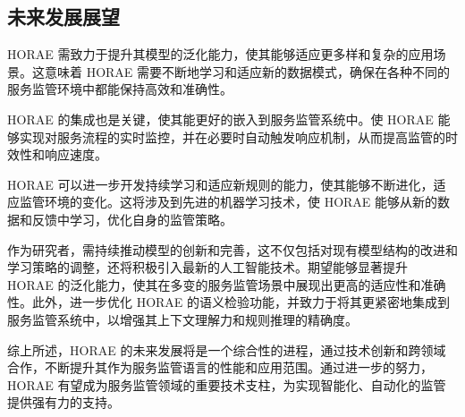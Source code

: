 \subsection{未来发展展望}

HORAE 需致力于提升其模型的泛化能力，使其能够适应更多样和复杂的应用场景。这意味着 HORAE 需要不断地学习和适应新的数据模式，确保在各种不同的服务监管环境中都能保持高效和准确性。

HORAE 的集成也是关键，使其能更好的嵌入到服务监管系统中。使 HORAE 能够实现对服务流程的实时监控，并在必要时自动触发响应机制，从而提高监管的时效性和响应速度。

HORAE 可以进一步开发持续学习和适应新规则的能力，使其能够不断进化，适应监管环境的变化。这将涉及到先进的机器学习技术，使 HORAE 能够从新的数据和反馈中学习，优化自身的监管策略。

作为研究者，需持续推动模型的创新和完善，这不仅包括对现有模型结构的改进和学习策略的调整，还将积极引入最新的人工智能技术。期望能够显著提升 HORAE 的泛化能力，使其在多变的服务监管场景中展现出更高的适应性和准确性。此外，进一步优化 HORAE 的语义检验功能，并致力于将其更紧密地集成到服务监管系统中，以增强其上下文理解力和规则推理的精确度。

综上所述，HORAE 的未来发展将是一个综合性的进程，通过技术创新和跨领域合作，不断提升其作为服务监管语言的性能和应用范围。通过进一步的努力，HORAE 有望成为服务监管领域的重要技术支柱，为实现智能化、自动化的监管提供强有力的支持。